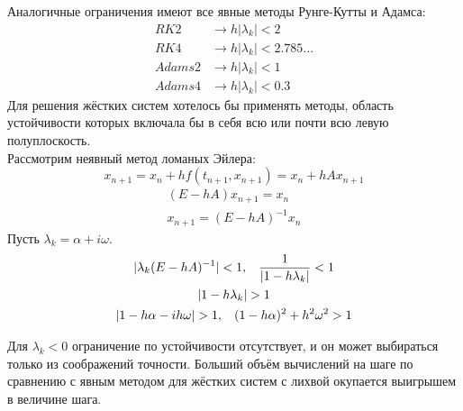 \documentclass[a4paper,11pt]{article}
\begin{document}
\noindent Аналогичные ограничения имеют все явные методы Рунге-Кутты и Адамса:
\begin{align*}
  RK2    &\rightarrow h|\lambda_k| < 2 \\
  RK4    &\rightarrow h|\lambda_k| < 2.785\dots \\
  Adams2 &\rightarrow h|\lambda_k| < 1 \\
  Adams4 &\rightarrow h|\lambda_k| < 0.3
\end{align*}
Для решения жёстких систем хотелось бы применять методы, область устойчивости которых включала бы в себя всю или почти всю левую полуплоскость. \\

\noindent Рассмотрим неявный метод ломаных Эйлера:
\[x_{n+1} = x_n + hf(t_{n+1}, x_{n+1}) = x_n + hAx_{n+1}\]
\begin{gather*}
  (E - hA)x_{n+1} = x_n \\
  x_{n+1} = (E - hA)^{-1}x_n
\end{gather*}
Пусть $\lambda_k = \alpha + i\omega$.
\begin{gather*}
  |\lambda_k(E - hA)^{-1}| < 1, \hspace{3mm}
  \frac{1}{|1 - h\lambda_k|} < 1 \\
  |1 - h\lambda_k| > 1 \\
  |1 - h\alpha - ih\omega| > 1, \hspace{3mm}
  (1 - h\alpha)^2 + h^2\omega^2 > 1
\end{gather*}
\begin{center}
\end{center}
Для $\lambda_k < 0$ ограничение по устойчивости отсутствует, и он может выбираться только из соображений точности. Больший объём вычислений на шаге по сравнению
  с явным методом для жёстких систем с лихвой окупается выигрышем в величине шага. \\
\end{document}
